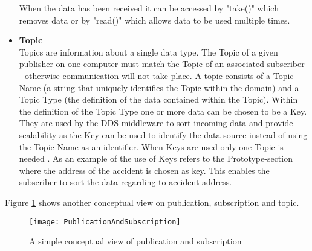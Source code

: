 \documentclass[Main]{subfiles}
\begin{document}
\begin{itemize}
When the data has been received it can be accessed by "take()" which removes data or by "read()" which allows data to be used multiple times.

  \item \textbf{Topic}
  \\
  Topics are information about a single data type. 
  The Topic of a given publisher on one computer must match the Topic of an associated subscriber - otherwise communication will not take place. 
  A topic consists of a Topic Name (a string that uniquely identifies the Topic within the domain) and a Topic Type (the definition of the data contained within the Topic). 
  Within the definition of the Topic Type one or more data can be chosen to be a Key. 
  They are used by the DDS middleware to sort incoming data and provide scalability as the Key can be used to identify the data-source instead of using the Topic Name as an identifier. 
  When Keys are used only one Topic is needed \cite{RTI} \cite{opendds} \cite{DDS-slides}. 
  As an example of the use of Keys refers to the Prototype-section where the address of the accident is chosen as key. 
  This enables the subscriber to sort the data regarding to accident-address.
\end{itemize}

Figure \ref{fig:pubSub} shows another conceptual view on publication, subscription and topic. 

\begin{figure}[H]
\centering
\texttt{[image: PublicationAndSubscription]}
\caption{A simple conceptual view of publication and subscription \cite{ddsopen}}
\label{fig:pubSub}
\end{figure}
\end{document}
